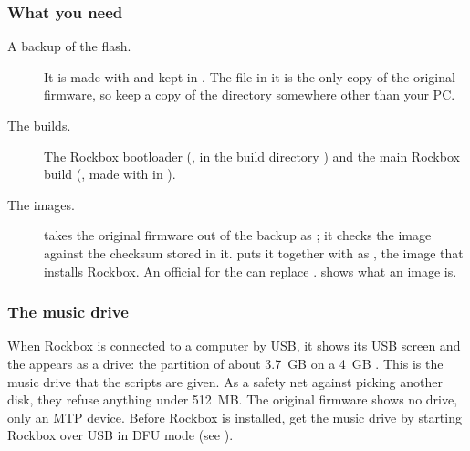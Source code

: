 \subsubsection{What you need}
\begin{description}
  \item[A backup of the \daps{} flash.] It is made with
     and kept in
    . The file  in it is
    the only copy of the original firmware, so keep a copy of the directory
    somewhere other than your PC.
  \item[The builds.] The Rockbox bootloader (, in the
    build directory ) and the main Rockbox build
    (, made with  in
    ).
  \item[The images.] 
    takes the original firmware out of the backup as
    ; it checks the image against the checksum stored
    in it.  puts it together with
     as , the image that installs
    Rockbox. An official \playerman{}  for the \playertype{}
    can replace . 
    shows what an image is.
\end{description}

\subsubsection{The music drive}
When Rockbox is connected to a computer by USB, it shows its USB screen and
the \dap{} appears as a drive: the partition of about 3.7~GB on a 4~GB
\dap{}. This is the music drive that the scripts are given. As a safety net
against picking another disk, they refuse anything under 512~MB. The
original firmware shows no drive, only an MTP device. Before Rockbox is
installed, get the music drive by starting Rockbox over USB in DFU mode (see
).

